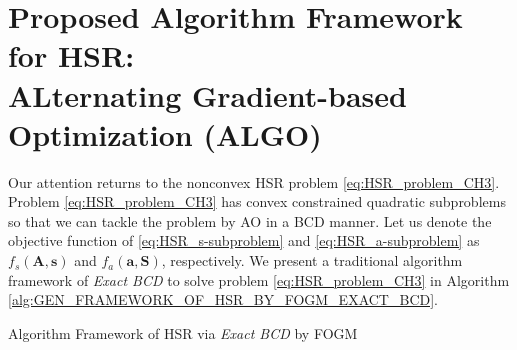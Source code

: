 \section{Proposed Algorithm Framework for HSR:\\
         ALternating Gradient-based Optimization (ALGO)}
Our attention returns to the nonconvex HSR problem \eqref{eq:HSR_problem_CH3}.
Problem \eqref{eq:HSR_problem_CH3} has convex constrained quadratic
subproblems so that we can tackle the problem by AO in a BCD manner.
Let us denote the objective function of \eqref{eq:HSR_s-subproblem} and
\eqref{eq:HSR_a-subproblem} as $f_s(\bm A,\bm s)$ and $f_a(\bm a,\bm S)$,
respectively.
We present a traditional algorithm framework of \textit{Exact BCD} to solve
problem \eqref{eq:HSR_problem_CH3} in Algorithm
\ref{alg:GEN_FRAMEWORK_OF_HSR_BY_FOGM_EXACT_BCD}.
\begin{algorithm}
    \caption{Algorithm Framework of HSR via \textit{Exact BCD} by FOGM}
    \label{alg:GEN_FRAMEWORK_OF_HSR_BY_FOGM_EXACT_BCD}
    \begin{algorithmic}[1]
        \smallskip
            \smallskip
            \smallskip
            \smallskip
                \smallskip
                \smallskip
            \EndFor
            \smallskip
            \smallskip
            \smallskip
                \smallskip
                \smallskip
            \EndFor
            \smallskip
            \smallskip
        \EndFor
        \smallskip
    \end{algorithmic}
\end{algorithm}

